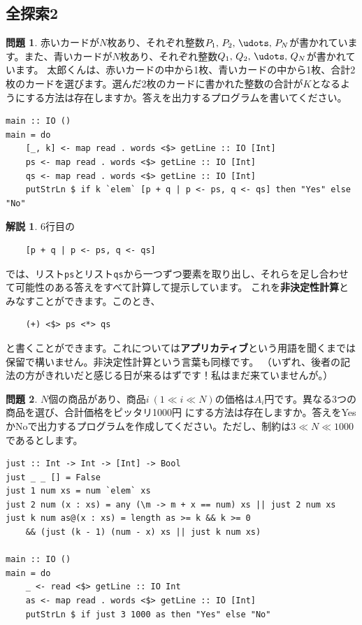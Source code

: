 \documentclass[12pt,a4paper,dvipdfmx,fleqn]{article}%
\theoremstyle{definition}
\newtheorem*{toi*}{問題}
\theoremstyle{definition}
\newtheorem*{ans*}{解説}
\theoremstyle{definition}
\begin{document}
\subsection{全探索2}\label{全探索2}
\begin{toi*}
    赤いカードが$N$枚あり、それぞれ整数$P_1,\,P_2,\,\udots,\,P_N$が書かれています。また、青いカードが$N$枚あり、それぞれ整数$Q_1,\,Q_2,\,\udots,\,Q_N$が書かれています。
    太郎くんは、赤いカードの中から1枚、青いカードの中から1枚、合計2枚のカードを選びます。選んだ2枚のカードに書かれた整数の合計が$K$となるようにする方法は存在しますか。答えを出力するプログラムを書いてください。
\end{toi*}
\begin{lstlisting}[caption=A03.hs,label=A03]
main :: IO ()
main = do
    [_, k] <- map read . words <$> getLine :: IO [Int]
    ps <- map read . words <$> getLine :: IO [Int]
    qs <- map read . words <$> getLine :: IO [Int]
    putStrLn $ if k `elem` [p + q | p <- ps, q <- qs] then "Yes" else "No"
\end{lstlisting}
\begin{ans*}
    6行目の
    \begin{verbatim}
    [p + q | p <- ps, q <- qs]
    \end{verbatim}
    \vspace*{-4mm}
    では、リスト\texttt{ps}とリスト\texttt{qs}から一つずつ要素を取り出し、それらを足し合わせて可能性のある答えをすべて計算して提示しています。
    これを{\bf 非決定性計算}とみなすことができます。このとき、
    \begin{verbatim}
    (+) <$> ps <*> qs
    \end{verbatim}
    \vspace*{-4mm}
    と書くことができます。これについては{\bf アプリカティブ}という用語を聞くまでは保留で構いません。非決定性計算という言葉も同様です。
    （いずれ、後者の記法の方がきれいだと感じる日が来るはずです！私はまだ来ていませんが。）
\end{ans*}
\begin{toi*}
    $N$個の商品があり、商品$i~(1\ll i\ll N)$の価格は$A_i$円です。異なる3つの商品を選び、合計価格をピッタリ1000円
    にする方法は存在しますか。答えをYesかNoで出力するプログラムを作成してください。ただし、制約は$3\ll N\ll 1000$であるとします。
\end{toi*}
\begin{lstlisting}[caption=B03.hs,label=B03]
just :: Int -> Int -> [Int] -> Bool
just _ _ [] = False
just 1 num xs = num `elem` xs
just 2 num (x : xs) = any (\m -> m + x == num) xs || just 2 num xs
just k num as@(x : xs) = length as >= k && k >= 0
    && (just (k - 1) (num - x) xs || just k num xs)

main :: IO ()
main = do
    _ <- read <$> getLine :: IO Int
    as <- map read . words <$> getLine :: IO [Int]
    putStrLn $ if just 3 1000 as then "Yes" else "No"
\end{lstlisting}
\end{document}
